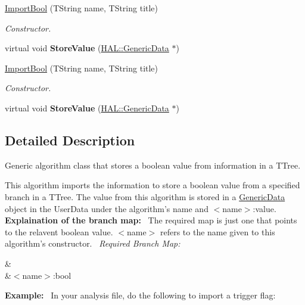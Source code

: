 \begin{DoxyCompactItemize}
\item 
\hyperlink{class_h_a_l_1_1_algorithms_1_1_import_bool_a060a260af56afe85c10ff992a0a8b3fa}{Import\+Bool} (T\+String name, T\+String title)
\begin{DoxyCompactList}\small\item\em Constructor. \end{DoxyCompactList}\item 
\hypertarget{class_h_a_l_1_1_algorithms_1_1_import_bool_a5cb75ed42fe19b3c406d8defbf8aaa4f}{virtual void {\bfseries Store\+Value} (\hyperlink{class_h_a_l_1_1_generic_data}{H\+A\+L\+::\+Generic\+Data} $\ast$)}\label{class_h_a_l_1_1_algorithms_1_1_import_bool_a5cb75ed42fe19b3c406d8defbf8aaa4f}

\item 
\hyperlink{class_h_a_l_1_1_algorithms_1_1_import_bool_a060a260af56afe85c10ff992a0a8b3fa}{Import\+Bool} (T\+String name, T\+String title)
\begin{DoxyCompactList}\small\item\em Constructor. \end{DoxyCompactList}\item 
\hypertarget{class_h_a_l_1_1_algorithms_1_1_import_bool_a5cb75ed42fe19b3c406d8defbf8aaa4f}{virtual void {\bfseries Store\+Value} (\hyperlink{class_h_a_l_1_1_generic_data}{H\+A\+L\+::\+Generic\+Data} $\ast$)}\label{class_h_a_l_1_1_algorithms_1_1_import_bool_a5cb75ed42fe19b3c406d8defbf8aaa4f}

\end{DoxyCompactItemize}


\subsection{Detailed Description}
Generic algorithm class that stores a boolean value from information in a T\+Tree. 

This algorithm imports the information to store a boolean value from a specified branch in a T\+Tree. The value from this algorithm is stored in a \hyperlink{class_h_a_l_1_1_generic_data}{Generic\+Data} object in the User\+Data under the algorithm's name and $<$name$>$\+:value.~\newline
~\newline
{\bfseries Explaination of the branch map\+:}~\newline
The required map is just one that points to the relavent boolean value. $<$name$>$ refers to the name given to this algorithm's constructor.~\newline
{\itshape Required Branch Map\+:} \begin{TabularC}{2}
\hline
{}&\PBS{}\\
&\PBS\centering $<$name$>$\+:bool \\
\end{TabularC}
{\bfseries Example\+:}~\newline
In your analysis file, do the following to import a trigger flag\+:


